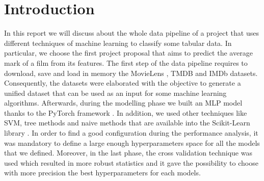 \documentclass[../main]{subfiles}
\begin{document}
\chapter{Introduction}
In this report we will discuss about the whole data pipeline of a project that uses different techniques of machine learning to classify some tabular data.
In particular, we choose the first project proposal that aims to predict the average mark of a film from its features.
The first step of the data pipeline requires to download, save and load in memory the MovieLens \cite{site:movielens-datasets}, TMDB \cite{site:tmdb-api-overview} and IMDb \cite{site:imdb-datasets} datasets.  
Consequently, the datasets were elaborated with the objective to generate a unified dataset that can be used as an input for some machine learning algorithms.
Afterwards, during the modelling phase we built an MLP model thanks to the PyTorch framework \cite{NEURIPS2019_9015}.
In addition, we used other techniques like SVM, tree methods and naive methods that are available into the Scikit-Learn library \cite{scikit-learn}. 
In order to find a good configuration during the performance analysis, it was mandatory to define a large enough hyperparameters space for all the models that we defined.
Moreover, in the last phase, the cross validation technique was used which resulted in more robust statistics and it gave the possibility to choose with more precision the best hyperparameters for each models.
\end{document}
